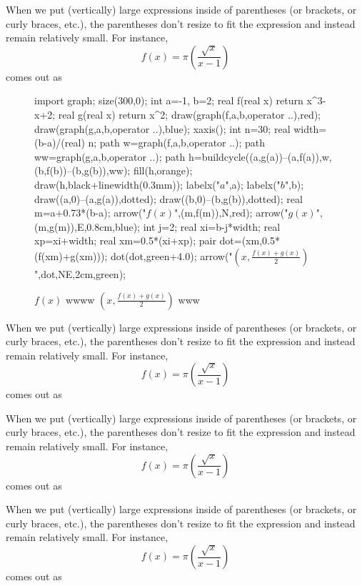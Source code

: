 \documentclass[a4paper]{book}
\begin{document}
When we put (vertically) large expressions inside of parentheses (or brackets, or curly braces, etc.), the parentheses don't resize to fit the expression and instead remain relatively small. For instance, $$f(x) = \pi(\frac{\sqrt{x}}{x-1})$$ comes out as





\begin{figure}[!ht]
	\centering
	\begin{asy}
	import graph;
	size(300,0);
	int a=-1, b=2;
	real f(real x) {return x^3-x+2;}
	real g(real x) {return x^2;}
	draw(graph(f,a,b,operator ..),red);
	draw(graph(g,a,b,operator ..),blue);
	xaxis();
	int n=30;
	real width=(b-a)/(real) n;
	path w=graph(f,a,b,operator ..);
	path ww=graph(g,a,b,operator ..);
	path h=buildcycle((a,g(a))--(a,f(a)),w,(b,f(b))--(b,g(b)),ww);
	fill(h,orange);
	draw(h,black+linewidth(0.3mm));
	labelx("$a$",a);
	labelx("$b$",b);
	draw((a,0)--(a,g(a)),dotted);
	draw((b,0)--(b,g(b)),dotted);
	real m=a+0.73*(b-a);
	arrow("$f(x)$",(m,f(m)),N,red);
	arrow("$g(x)$",(m,g(m)),E,0.8cm,blue);
	int j=2;
	real xi=b-j*width;
	real xp=xi+width;
	real xm=0.5*(xi+xp);
	pair dot=(xm,0.5*(f(xm)+g(xm)));
	dot(dot,green+4.0);
	arrow("$\left(x,\frac{f(x)+g(x)}{2}\right)$",dot,NE,2cm,green);
	\end{asy}
	\caption{$f(x)$ wwww $\left(x,\frac{f(x)+g(x)}{2}\right)$ www}
\end{figure}


When we put (vertically) large expressions inside of parentheses (or brackets, or curly braces, etc.), the parentheses don't resize to fit the expression and instead remain relatively small. For instance, $$f(x) = \pi(\frac{\sqrt{x}}{x-1})$$ comes out as

When we put (vertically) large expressions inside of parentheses (or brackets, or curly braces, etc.), the parentheses don't resize to fit the expression and instead remain relatively small. For instance, $$f(x) = \pi(\frac{\sqrt{x}}{x-1})$$ comes out as

When we put (vertically) large expressions inside of parentheses (or brackets, or curly braces, etc.), the parentheses don't resize to fit the expression and instead remain relatively small. For instance, $$f(x) = \pi(\frac{\sqrt{x}}{x-1})$$ comes out as
\end{document}
